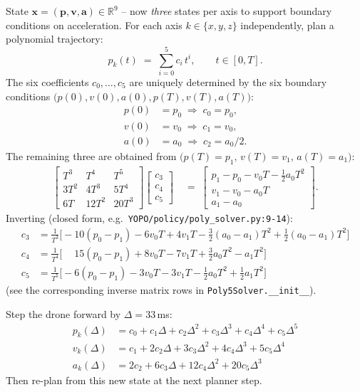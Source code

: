 \documentclass[11pt]{article}
\newcommand{\R}{\mathbb{R}}
\begin{document}
State $\bm{x} = (\bm{p}, \bm{v}, \bm{a}) \in \R^9$ -- now \emph{three} states per axis to support boundary conditions on acceleration.  For each axis $k \in \{x, y, z\}$ independently, plan a polynomial trajectory:
\begin{equation}\label{eq:poly5}
p_k(t) \;=\; \sum_{i=0}^{5} c_i\, t^{i}, \qquad t \in [0, T].
\end{equation}
The six coefficients $c_0,\dots,c_5$ are uniquely determined by the six boundary conditions $\bigl(p(0), v(0), a(0), p(T), v(T), a(T)\bigr)$:
\begin{align}
p(0) &= p_0 \;\Longrightarrow\; c_0 = p_0,\\
v(0) &= v_0 \;\Longrightarrow\; c_1 = v_0,\\
a(0) &= a_0 \;\Longrightarrow\; c_2 = a_0 / 2.
\end{align}
The remaining three are obtained from $\bigl(p(T)=p_1,\, v(T)=v_1,\, a(T)=a_1\bigr)$:
\begin{align}
\begin{bmatrix} T^3 & T^4 & T^5 \\ 3T^2 & 4T^3 & 5T^4 \\ 6T & 12T^2 & 20T^3 \end{bmatrix}
\begin{bmatrix} c_3 \\ c_4 \\ c_5 \end{bmatrix}
&\;=\;
\begin{bmatrix} p_1 - p_0 - v_0 T - \tfrac{1}{2} a_0 T^2 \\ v_1 - v_0 - a_0 T \\ a_1 - a_0 \end{bmatrix}.
\end{align}
Inverting (closed form, e.g.\ \texttt{YOPO/policy/poly\_solver.py:9-14}):
\begin{align}
c_3 &= \tfrac{1}{T^3}\!\bigl[-10(p_0 - p_1) - 6 v_0 T + 4 v_1 T - \tfrac{3}{2}(a_0 - a_1) T^2 + \tfrac{1}{2}(a_0 - a_1) T^2\bigr]\\
c_4 &= \tfrac{1}{T^4}\!\bigl[\phantom{-}15(p_0 - p_1) + 8 v_0 T - 7 v_1 T + \tfrac{3}{2} a_0 T^2 - a_1 T^2\bigr]\\
c_5 &= \tfrac{1}{T^5}\!\bigl[-6(p_0 - p_1) - 3 v_0 T - 3 v_1 T - \tfrac{1}{2} a_0 T^2 + \tfrac{1}{2} a_1 T^2\bigr]
\end{align}
(see the corresponding inverse matrix rows in \texttt{Poly5Solver.\_\_init\_\_}).

Step the drone forward by $\Delta = 33\,$ms:
\begin{align}
p_k(\Delta) &= c_0 + c_1\Delta + c_2 \Delta^2 + c_3 \Delta^3 + c_4 \Delta^4 + c_5 \Delta^5\\
v_k(\Delta) &= c_1 + 2 c_2\Delta + 3 c_3 \Delta^2 + 4 c_4 \Delta^3 + 5 c_5 \Delta^4\\
a_k(\Delta) &= 2 c_2 + 6 c_3\Delta + 12 c_4 \Delta^2 + 20 c_5 \Delta^3
\end{align}
Then re-plan from this new state at the next planner step.
\end{document}
